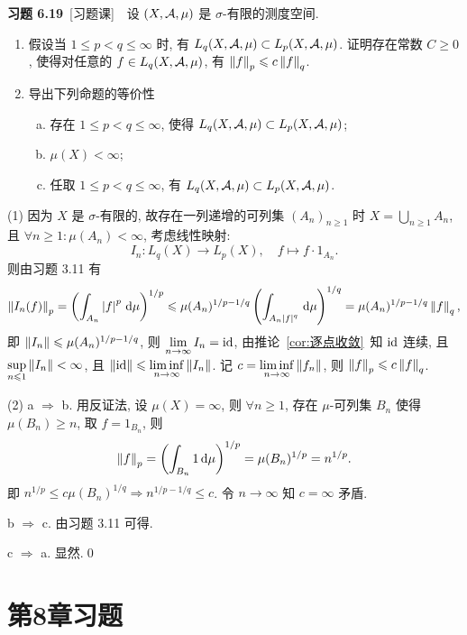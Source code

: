 	\textbf{习题 6.19}\ [习题课]\ \ 设 $ (X, \mathcal{A}, \mu) $ 是 $ \sigma $-有限的测度空间.
	\begin{enumerate}[(1)]
		\item 假设当 $ 1\leqslant p<q\leqslant\infty $ 时, 有 $ L_{q}(X, \mathcal{A}, \mu)\subset L_{p}(X, \mathcal{A}, \mu) $. 证明存在常数 $ C\geqslant0 $, 使得对任意的 $ f\in L_{q}(X, \mathcal{A}, \mu) $, 有 $ \left\| f \right\|_{p}\leqslant c\left\| f \right\|_{q} $.
		\item 导出下列命题的等价性
		\begin{enumerate}[a. ]
			\item 存在 $ 1\leqslant p<q\leqslant\infty $, 使得 $ L_{q}(X, \mathcal{A}, \mu)\subset L_{p}(X, \mathcal{A}, \mu) $;
			\item $ \mu(X)<\infty $;
			\item 任取 $ 1\leqslant p<q\leqslant\infty $, 有 $ L_{q}(X, \mathcal{A}, \mu)\subset L_{p}(X, \mathcal{A}, \mu) $.
		\end{enumerate}
	\end{enumerate}
	\begin{Proof}
		(1) 因为 $ X $ 是 $ \sigma $-有限的, 故存在一列递增的可列集 $ (A_{n})_{n\geqslant1} $ 时 $ X=\bigcup_{n\geqslant1}A_{n} $, 且 $ \forall n\geqslant1:\mu(A_{n})<\infty $, 考虑线性映射:
		\[
			I_{n}: L_{q}(X)\to L_{p}(X), \quad f\mapsto f\cdot 1_{A_{n}}.
		\] 
		则由习题 3.11 有
		\[
			\left\| I_{n}(f) \right\|_{p}=\left( \int_{A_{n}}\left| f \right| ^{p}\,\mathrm{d}\mu \right)^{1/p}\leqslant \mu(A_{n})^{1/p-1/q}\left( \int_{A_{n}\left| f \right| ^{q}}\,\mathrm{d}\mu \right)^{1/q}=\mu(A_{n})^{1/p-1/q}\left\| f \right\|_{q},
		\]
		即 $ \left\| I_{n} \right\|\leqslant\mu(A_{n})^{1/p-1/q} $, 则 $ \lim\limits_{n\to\infty}I_{n}=\mathrm{id} $, 由推论~\ref{cor:逐点收敛}~知 $ \mathrm{id} $ 连续, 且 $ \sup\limits_{n\leqslant1}\left\| I_{n} \right\|<\infty $, 且 $ \left\| \mathrm{id} \right\|\leqslant\liminf\limits_{n\to\infty}\left\| I_{n} \right\| $. 记 $ c=\liminf\limits_{n\to\infty}\left\| f_{n} \right\| $, 则 $ \left\| f \right\|_{p}\leqslant c\left\| f \right\|_{q} $.
		
		(2) a $ \Rightarrow $ b. 用反证法, 设 $ \mu(X)=\infty $, 则 $ \forall n\geqslant1 $, 存在 $ \mu $-可列集 $ B_{n} $ 使得 $ \mu(B_{n})\geqslant n $, 取 $ f = 1_{B_{n}} $, 则
		\[
			\left\| f \right\|_{p}=\left( \int_{B_{n}}1\,\mathrm{d}\mu \right)^{1/p}=\mu(B_{n})^{1/p}=n^{1/p}.
		\]
		即 $ n^{1/p}\leqslant c\mu(B_{n})^{1/q}\Longrightarrow n^{1/p-1/q}\leqslant c $. 令 $ n\to \infty $ 知 $ c=\infty $ 矛盾.

		b $ \Rightarrow $ c. 由习题 3.11 可得.

		c $ \Rightarrow $ a. 显然.\qed
	\end{Proof}

\section{第8章习题}

